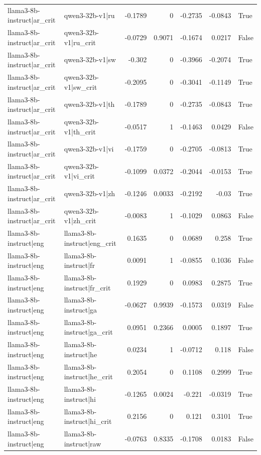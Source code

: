 \begin{table}
\begin{tabular}{l l r r r r l}
llama3-8b-instruct|ar_crit & qwen3-32b-v1|ru & -0.1789 & 0 & -0.2735 & -0.0843 & True \\
llama3-8b-instruct|ar_crit & qwen3-32b-v1|ru_crit & -0.0729 & 0.9071 & -0.1674 & 0.0217 & False \\
llama3-8b-instruct|ar_crit & qwen3-32b-v1|sw & -0.302 & 0 & -0.3966 & -0.2074 & True \\
llama3-8b-instruct|ar_crit & qwen3-32b-v1|sw_crit & -0.2095 & 0 & -0.3041 & -0.1149 & True \\
llama3-8b-instruct|ar_crit & qwen3-32b-v1|th & -0.1789 & 0 & -0.2735 & -0.0843 & True \\
llama3-8b-instruct|ar_crit & qwen3-32b-v1|th_crit & -0.0517 & 1 & -0.1463 & 0.0429 & False \\
llama3-8b-instruct|ar_crit & qwen3-32b-v1|vi & -0.1759 & 0 & -0.2705 & -0.0813 & True \\
llama3-8b-instruct|ar_crit & qwen3-32b-v1|vi_crit & -0.1099 & 0.0372 & -0.2044 & -0.0153 & True \\
llama3-8b-instruct|ar_crit & qwen3-32b-v1|zh & -0.1246 & 0.0033 & -0.2192 & -0.03 & True \\
llama3-8b-instruct|ar_crit & qwen3-32b-v1|zh_crit & -0.0083 & 1 & -0.1029 & 0.0863 & False \\
llama3-8b-instruct|eng & llama3-8b-instruct|eng_crit & 0.1635 & 0 & 0.0689 & 0.258 & True \\
llama3-8b-instruct|eng & llama3-8b-instruct|fr & 0.0091 & 1 & -0.0855 & 0.1036 & False \\
llama3-8b-instruct|eng & llama3-8b-instruct|fr_crit & 0.1929 & 0 & 0.0983 & 0.2875 & True \\
llama3-8b-instruct|eng & llama3-8b-instruct|ga & -0.0627 & 0.9939 & -0.1573 & 0.0319 & False \\
llama3-8b-instruct|eng & llama3-8b-instruct|ga_crit & 0.0951 & 0.2366 & 0.0005 & 0.1897 & True \\
llama3-8b-instruct|eng & llama3-8b-instruct|he & 0.0234 & 1 & -0.0712 & 0.118 & False \\
llama3-8b-instruct|eng & llama3-8b-instruct|he_crit & 0.2054 & 0 & 0.1108 & 0.2999 & True \\
llama3-8b-instruct|eng & llama3-8b-instruct|hi & -0.1265 & 0.0024 & -0.221 & -0.0319 & True \\
llama3-8b-instruct|eng & llama3-8b-instruct|hi_crit & 0.2156 & 0 & 0.121 & 0.3101 & True \\
llama3-8b-instruct|eng & llama3-8b-instruct|raw & -0.0763 & 0.8335 & -0.1708 & 0.0183 & False \\

\end{tabular}
\end{table}
